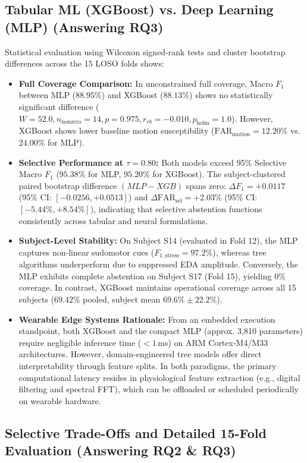 \documentclass[conference]{IEEEtran}
\begin{document}
\subsection{Tabular ML (XGBoost) vs. Deep Learning (MLP) (Answering RQ3)}
Statistical evaluation using Wilcoxon signed-rank tests and cluster bootstrap differences across the 15 LOSO folds shows:
\begin{itemize}
    \item \textbf{Full Coverage Comparison:} In unconstrained full coverage, Macro $F_1$ between MLP ($88.95\%$) and XGBoost ($88.13\%$) shows no statistically significant difference ($W = 52.0, n_{\text{nonzero}} = 14, p = 0.975, r_{rb} = -0.010, p_{\text{holm}} = 1.0$). However, XGBoost shows lower baseline motion susceptibility ($\text{FAR}_{\text{motion}} = 12.20\%$ vs. $24.00\%$ for MLP).
    \item \textbf{Selective Performance at $\tau = 0.80$:} Both models exceed 95\% Selective Macro $F_1$ ($95.38\%$ for MLP, $95.20\%$ for XGBoost). The subject-clustered paired bootstrap difference $(MLP - XGB)$ spans zero: $\Delta F_1 = +0.0117$ (95\% CI: $[-0.0256, +0.0513]$) and $\Delta \text{FAR}_{\text{sel}} = +2.03\%$ (95\% CI: $[-5.44\%, +8.54\%]$), indicating that selective abstention functions consistently across tabular and neural formulations.
    \item \textbf{Subject-Level Stability:} On Subject S14 (evaluated in Fold 12), the MLP captures non-linear sudomotor cues ($F_{1,\text{stress}} = 97.2\%$), whereas tree algorithms underperform due to suppressed EDA amplitude. Conversely, the MLP exhibits complete abstention on Subject S17 (Fold 15), yielding 0\% coverage. In contrast, XGBoost maintains operational coverage across all 15 subjects ($69.42\%$ pooled, subject mean $69.6\% \pm 22.2\%$).
    \item \textbf{Wearable Edge Systems Rationale:} From an embedded execution standpoint, both XGBoost and the compact MLP (approx. 3,810 parameters) require negligible inference time ($< 1$\,ms) on ARM Cortex-M4/M33 architectures. However, domain-engineered tree models offer direct interpretability through feature splits. In both paradigms, the primary computational latency resides in physiological feature extraction (e.g., digital filtering and spectral FFT), which can be offloaded or scheduled periodically on wearable hardware.
\end{itemize}

\subsection{Selective Trade-Offs and Detailed 15-Fold Evaluation (Answering RQ2 \& RQ3)}
\end{document}
